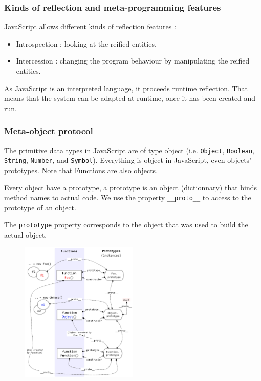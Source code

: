 \documentclass[a4paper,10pt]{article}
\begin{document}
\subsubsection{Kinds of reflection and meta-programming features}

JavaScript allows different kinds of reflection features :
\begin{itemize}
    \item Introspection : looking at the reified entities.
    \item Intercession : changing the program behaviour by manipulating the reified entities.
\end{itemize}

As JavaScript is an interpreted language, it proceeds runtime reflection.
That means that the system can be adapted at runtime, once it has been created and run.



\subsubsection{Meta-object protocol}

The primitive data types in JavaScript are of type object (i.e. \lstinline|Object|, \mbox{\lstinline|Boolean|,} \lstinline|String|, \lstinline|Number|, and \lstinline|Symbol|).
Everything is object in JavaScript, even objects’ prototypes.
Note that Functions are also objects.

Every object have a prototype, a prototype is an object (dictionnary) that binds method names to actual code. We use the property \lstinline|__proto__| to access to the prototype of an object.

The \lstinline|prototype| property corresponds to the object that was used to build the actual object.

\begin{figure}[h]
    \centering
    \includegraphics[width=0.5\textwidth]{jstypes.png}
\end{figure}
\end{document}
